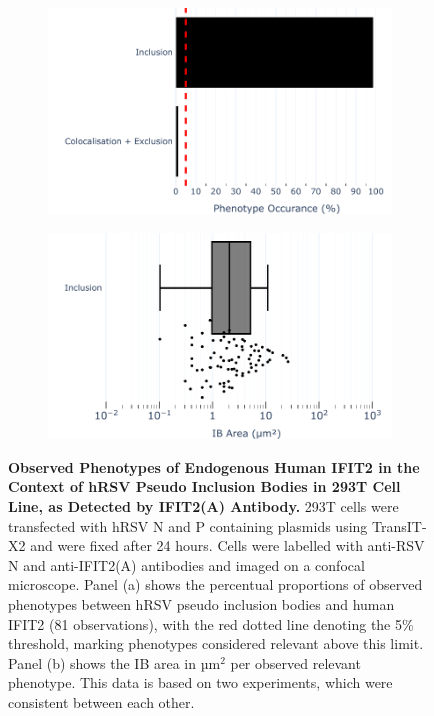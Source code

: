 \begin{figure}
    \begin{subfigure}{0.495\textwidth}
        \caption{}
        \includegraphics[width=1\linewidth]{09. Chapter 4/Figs/01. pIB/03. IFIT2/02. IFIT2A/01. bar_i2a_293t.pdf}
    \end{subfigure}
    \begin{subfigure}{0.495\textwidth}
        \caption{}
        \includegraphics[width=1\linewidth]{09. Chapter 4/Figs/01. pIB/03. IFIT2/02. IFIT2A/02. box_i2a_293t.pdf}
    \end{subfigure}
    \caption[Observed Phenotypes of Endogenous Human IFIT2 in the Context of hRSV Pseudo Inclusion Bodies in 293T Cell Line, as Detected by IFIT2(A) Antibody.]{\textbf{Observed Phenotypes of Endogenous Human IFIT2 in the Context of hRSV Pseudo Inclusion Bodies in 293T Cell Line, as Detected by IFIT2(A) Antibody.} 293T cells were transfected with hRSV N and P containing plasmids using TransIT-X2 and were fixed after 24 hours. Cells were labelled with anti-RSV N and anti-IFIT2(A) antibodies and imaged on a confocal microscope. Panel (a) shows the percentual proportions of observed phenotypes between hRSV pseudo inclusion bodies and human IFIT2 (81 observations), with the red dotted line denoting the 5\% threshold, marking phenotypes considered relevant above this limit. Panel (b) shows the IB area in \(\mbox{µm}^2\) per observed relevant phenotype. This data is based on two experiments, which were consistent between each other.}
    \label{fig:Observed Phenotypes of Endogenous Human IFIT2 in the Context of hRSV Pseudo Inclusion Bodies in 293T Cell Line, as Detected by IFIT2(A) Antibody}
\end{figure}

